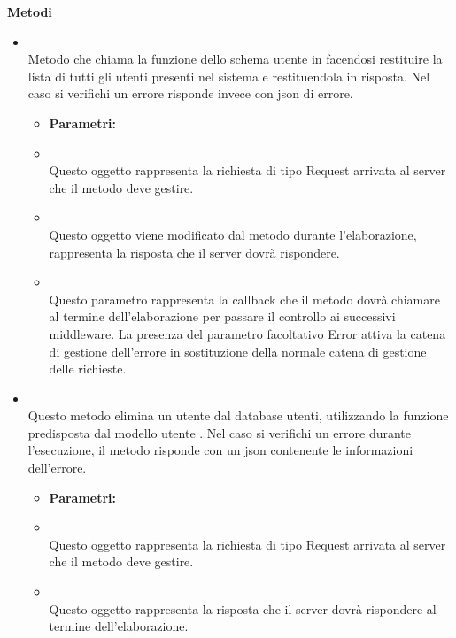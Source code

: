 		\textbf{Metodi} 
	\begin{itemize}
					\item[] \textbf{} \\ Metodo che chiama la funzione  dello schema utente in  facendosi restituire la lista di tutti gli utenti presenti nel sistema e restituendola in risposta. Nel caso si verifichi un errore risponde invece con json di errore.
						\begin{itemize}\addtolength{\itemsep}{-0.5\baselineskip}
						\item[] \textbf{Parametri:}
						\item[]  \\ Questo oggetto rappresenta la richiesta di tipo Request arrivata al server che il metodo deve gestire.	
						\item[]  \\ Questo oggetto viene modificato dal metodo durante l'elaborazione, rappresenta la risposta che il server dovrà rispondere.	
						\item[]  \\ Questo parametro rappresenta la callback che il metodo dovrà chiamare al termine dell'elaborazione per passare il controllo ai successivi middleware. La presenza del parametro facoltativo Error attiva la catena di gestione dell'errore in sostituzione della normale catena di gestione delle richieste.	
				\end{itemize}
					\item[] \textbf{} \\ Questo metodo elimina un utente dal database utenti, utilizzando la funzione predisposta dal modello utente . Nel caso si verifichi un errore durante l'esecuzione, il metodo risponde con un json contenente le informazioni dell'errore.
						\begin{itemize}\addtolength{\itemsep}{-0.5\baselineskip}
						\item[] \textbf{Parametri:}
						\item[]  \\ Questo oggetto rappresenta la richiesta di tipo Request arrivata al server che il metodo deve gestire.	
						\item[]  \\ Questo oggetto rappresenta la risposta che il server dovrà rispondere al termine dell'elaborazione.	

\end{itemize}
\end{itemize}
